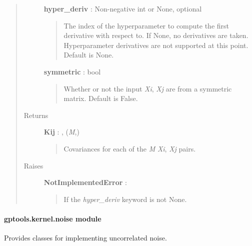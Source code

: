 \documentclass[letterpaper,10pt,english]{sphinxmanual}
\begin{document}
\begin{fulllineitems}
\begin{fulllineitems}
\begin{quote}
\begin{description}
\textbf{hyper\_deriv} : Non-negative int or None, optional
\begin{quote}

The index of the hyperparameter to compute the first derivative
with respect to. If None, no derivatives are taken. Hyperparameter
derivatives are not supported at this point. Default is None.
\end{quote}

\textbf{symmetric} : bool
\begin{quote}

Whether or not the input \emph{Xi}, \emph{Xj} are from a symmetric matrix.
Default is False.
\end{quote}

\item[{Returns}] \leavevmode
\textbf{Kij} : , (\emph{M},)
\begin{quote}

Covariances for each of the \emph{M} \emph{Xi}, \emph{Xj} pairs.
\end{quote}

\item[{Raises}] \leavevmode
\textbf{NotImplementedError} :
\begin{quote}

If the \emph{hyper\_deriv} keyword is not None.
\end{quote}

\end{description}\end{quote}

\end{fulllineitems}


\end{fulllineitems}



\paragraph{gptools.kernel.noise module}
\label{gptools.kernel:module-gptools.kernel.noise}\label{gptools.kernel:gptools-kernel-noise-module}
Provides classes for implementing uncorrelated noise.
\end{document}
